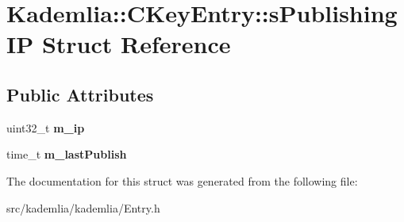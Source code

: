 \section{Kademlia::CKeyEntry::sPublishingIP Struct Reference}
\label{structKademlia_1_1CKeyEntry_1_1sPublishingIP}
\subsection*{Public Attributes}
\begin{DoxyCompactItemize}
\item 
uint32\_\-t {\bfseries m\_\-ip}\label{structKademlia_1_1CKeyEntry_1_1sPublishingIP_a826487105e491c277f73f8d66d95017e}

\item 
time\_\-t {\bfseries m\_\-lastPublish}\label{structKademlia_1_1CKeyEntry_1_1sPublishingIP_a2478231c160770bc5e68823aaad45b84}

\end{DoxyCompactItemize}


The documentation for this struct was generated from the following file:\begin{DoxyCompactItemize}
\item 
src/kademlia/kademlia/Entry.h\end{DoxyCompactItemize}

